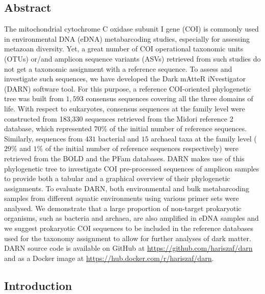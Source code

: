    \subsection{Abstract}
   The mitochondrial cytochrome C oxidase subunit I gene (COI) is commonly used in environmental DNA (eDNA) metabarcoding studies, especially for assessing metazoan diversity. 
   Yet, a great number of COI operational taxonomic units (OTUs) or/and amplicon sequence variants (ASVs) retrieved from such studies do not get a taxonomic assignment with a reference sequence. 
   To assess and investigate such sequences, we have developed the Dark mAtteR iNvestigator (DARN) software tool. For this purpose, a reference COI-oriented phylogenetic tree was built from $1,593$ consensus sequences covering all the three domains of life. 
   With respect to eukaryotes, consensus sequences at the family level were constructed from 183,330 sequences retrieved from the Midori reference 2 database, which represented $70\%$ of the initial number of reference sequences. 
   Similarly, sequences from $431$ bacterial and $15$ archaeal taxa at the family level ($29\%$ and $1\%$ of the initial number of reference sequences respectively) were retrieved from the BOLD and the PFam databases. 
   DARN makes use of this phylogenetic tree to investigate COI pre-processed sequences of amplicon samples to provide both a tabular and a graphical overview of their phylogenetic assignments. 
   To evaluate DARN, both environmental and bulk metabarcoding samples from different aquatic environments using various primer sets were analysed. 
   We demonstrate that a large proportion of non-target prokaryotic organisms, such as bacteria and archaea, are also amplified in eDNA samples and we suggest prokaryotic COI sequences to be included in the reference databases used for the taxonomy assignment to allow for further analyses of dark matter. 
   DARN source code is available on GitHub at \href{https://github.com/hariszaf/darn}{https://github.com/hariszaf/darn} and as a Docker image at \href{https://hub.docker.com/r/hariszaf/darn}{https://hub.docker.com/r/hariszaf/darn}.

   \subsection{Introduction}



